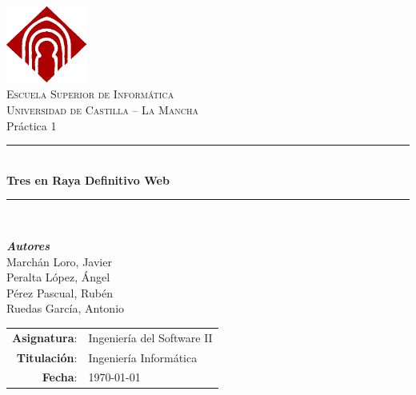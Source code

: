 \documentclass[a4paper,11pt,oneside]{article}
\begin{document}


\begin{titlepage}
\begin{center}

\includegraphics[width=0.2\textwidth]{img/logo-uclm.png}\\[1cm]
\textsc{\LARGE Escuela Superior de Informática}\\[0.5cm]
\textsc{\Large Universidad de Castilla -- La Mancha}\\[2.5cm]

{\LARGE Práctica 1}\\[0.5cm]
\rule{\linewidth}{0.5mm}\\[0.4cm]
{\huge \textbf{Tres en Raya Definitivo Web}}\\
\rule{\linewidth}{0.5mm}\\[0.4cm]

\begin{minipage}{0.5\textwidth}
\begin{flushleft}
\large
\hspace{1cm}\textbf{\emph{Autores}}\\
Marchán Loro, Javier\\
Peralta López, Ángel\\
Pérez Pascual, Rubén\\
Ruedas García, Antonio\\
\end{flushleft}
\end{minipage}
\vfill

\begin{minipage}{\textwidth}
\large
\begin{tabular}{rl}
\textbf{Asignatura}: & Ingeniería del Software II\\
\textbf{Titulación}: & Ingeniería Informática\\
\textbf{Fecha}: & \today
\end{tabular}
\end{minipage}

\end{center}
\end{titlepage}
\end{document}

